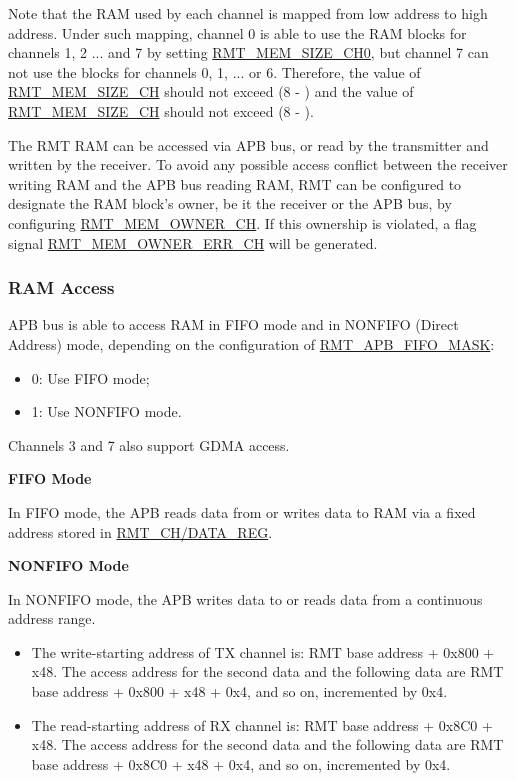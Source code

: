 \documentclass[main\_\_EN.tex]{subfiles}
\begin{document}
Note that the RAM used by each channel is mapped from low address to high address. Under such mapping, channel 0 is able to use the RAM blocks for channels 1, 2 ... and 7 by setting \hyperref[fielddesc:RMTMEMSIZECHN]{RMT\_MEM\_SIZE\_CH0}, but channel 7 can not use the blocks for channels 0, 1, ... or 6. Therefore, the value of \hyperref[fielddesc:RMTMEMSIZECHN]{RMT\_MEM\_SIZE\_CH} should not exceed (8 - ) and the value of \hyperref[fielddesc:RMTMEMSIZECHN]{RMT\_MEM\_SIZE\_CH} should not exceed (8 - ).

The RMT RAM can be accessed via APB bus, or read by the transmitter and written by the receiver. To avoid any possible access conflict between the receiver writing RAM and the APB bus reading RAM, RMT can be configured to designate the RAM block's owner, be it the receiver or the APB bus, by configuring \hyperref[fielddesc:RMTMEMOWNERCHM]{RMT\_MEM\_OWNER\_CH}. If this ownership is violated, a flag signal \hyperref[fielddesc:RMTMEMOWNERERRCHM]{RMT\_MEM\_OWNER\_ERR\_CH} will be generated.


\subsubsection{RAM Access}

APB bus is able to access RAM in FIFO mode and in NONFIFO (Direct Address) mode, depending on the configuration of \hyperref[fielddesc:RMTAPBFIFOMASK]{RMT\_APB\_FIFO\_MASK}:

\begin{itemize}
    \item 0: Use FIFO mode;
    \item 1: Use NONFIFO mode.
\end{itemize}

Channels 3 and 7 also support GDMA access.

\textbf{FIFO Mode}

In FIFO mode, the APB reads data from or writes data to RAM via a fixed address stored in \hyperref[regdesc:RMTCHNDATAREG]{RMT\_CH/DATA\_REG}.

\textbf{NONFIFO Mode}

In NONFIFO mode, the APB writes data to or reads data from a continuous address range.
\begin{itemize}
    \item The write-starting address of TX channel   is: RMT base address + 0x800 + x48. The access address for the second data and the following data are RMT base address + 0x800 + x48 + 0x4, and so on, incremented by 0x4.
    \item The read-starting address of RX channel   is: RMT base address + 0x8C0 + x48. The access address for the second data and the following data are RMT base address + 0x8C0 + x48 + 0x4, and so on, incremented by 0x4.
\end{itemize}
\end{document}
